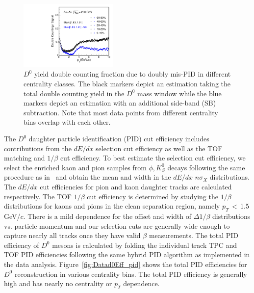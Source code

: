 \documentclass[%
 reprint,	
 amsmath,amssymb,
 aps,
 prc,
]{revtex4-1}
\begin{document}
\begin{figure}
\centering
\includegraphics[width=0.43\textwidth]{fig/Double_counting.pdf}
\caption{$D^{0}$ yield double counting fraction due to doubly mis-PID in different centrality classes. The black markers depict an estimation taking the total double counting yield in the $D^0$ mass window while the blue markers depict an estimation with an additional side-band (SB) subtraction. Note that most data points from different centrality bins overlap with each other.}
\label{fig:Datad0Eff_doublecounting} 
\end{figure}

The $D^0$ daughter particle identification (PID) cut efficiency includes contributions from the $dE/dx$ selection cut efficiency as well as the TOF matching and $1/\beta$ cut efficiency. To best estimate the selection cut efficiency, we select the enriched kaon and pion samples from $\phi,K_{S}^{0}$ decays following the same procedure as in~\cite{Shao:2005iu,Xu:2008th} and obtain the mean and width in the $dE/dx$ $n\sigma_X$ distributions. The $dE/dx$ cut efficiencies for pion and kaon daughter tracks are calculated respectively. The TOF $1/\beta$ cut efficiency is determined by studying the $1/\beta$ distributions for kaons and pions in the clean separation region, namely $p_{T}$\,$<$\,1.5\,GeV/$c$. There is a mild dependence for the offset and width of $\Delta 1/\beta$ distributions vs. particle momentum and our selection cuts are generally wide enough to capture nearly all tracks once they have valid $\beta$ measurements. The total PID efficiency of $D^0$ mesons is calculated by folding the individual track TPC and TOF PID efficiencies following the same hybrid PID algorithm as implemented in the data analysis. Figure~\ref{fig:Datad0Eff_pid} shows the total PID efficiencies for $D^0$ reconstruction in various centrality bins. The total PID efficiency is generally high and has nearly no centrality or $p_T$ dependence.
\end{document}
